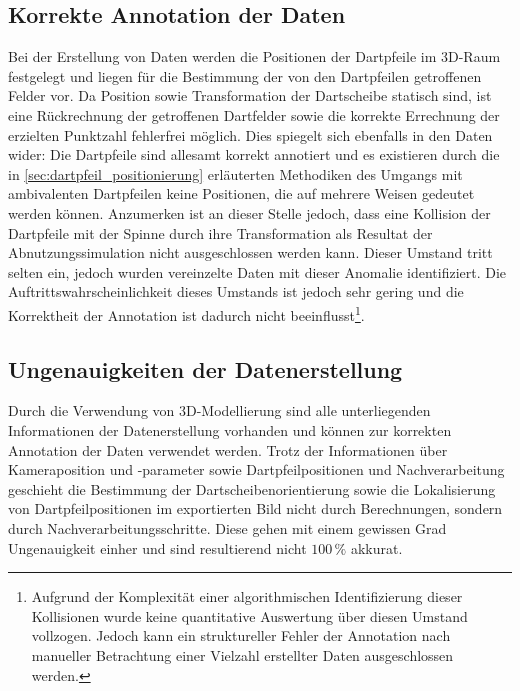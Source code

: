 
\subsection{Korrekte Annotation der Daten}  %
\label{sec:korrekte_annotation}  %

Bei der Erstellung von Daten werden die Positionen der Dartpfeile im 3D-Raum festgelegt und liegen für die Bestimmung der von den Dartpfeilen getroffenen Felder vor. Da Position sowie Transformation der Dartscheibe statisch sind, ist eine Rückrechnung der getroffenen Dartfelder sowie die korrekte Errechnung der erzielten Punktzahl fehlerfrei möglich. Dies spiegelt sich ebenfalls in den Daten wider: Die Dartpfeile sind allesamt korrekt annotiert und es existieren durch die in \autoref{sec:dartpfeil_positionierung} erläuterten Methodiken des Umgangs mit ambivalenten Dartpfeilen keine Positionen, die auf mehrere Weisen gedeutet werden können. Anzumerken ist an dieser Stelle jedoch, dass eine Kollision der Dartpfeile mit der Spinne durch ihre Transformation als Resultat der Abnutzungssimulation nicht ausgeschlossen werden kann. Dieser Umstand tritt selten ein, jedoch wurden vereinzelte Daten mit dieser Anomalie identifiziert. Die Auftrittswahrscheinlichkeit dieses Umstands ist jedoch sehr gering und die Korrektheit der Annotation ist dadurch nicht beeinflusst\footnote{Aufgrund der Komplexität einer algorithmischen Identifizierung dieser Kollisionen wurde keine quantitative Auswertung über diesen Umstand vollzogen. Jedoch kann ein struktureller Fehler der Annotation nach manueller Betrachtung einer Vielzahl erstellter Daten ausgeschlossen werden.}.


\subsection{Ungenauigkeiten der Datenerstellung}  %
\label{sec:daten_ungenauigkeiten}

Durch die Verwendung von 3D-Modellierung sind alle unterliegenden Informationen der Datenerstellung vorhanden und können zur korrekten Annotation der Daten verwendet werden. Trotz der Informationen über Kameraposition und -parameter sowie Dartpfeilpositionen und Nachverarbeitung geschieht die Bestimmung der Dartscheibenorientierung sowie die Lokalisierung von Dartpfeilpositionen im exportierten Bild nicht durch Berechnungen, sondern durch Nachverarbeitungsschritte. Diese gehen mit einem gewissen Grad Ungenauigkeit einher und sind resultierend nicht $100\,\%$ akkurat.

